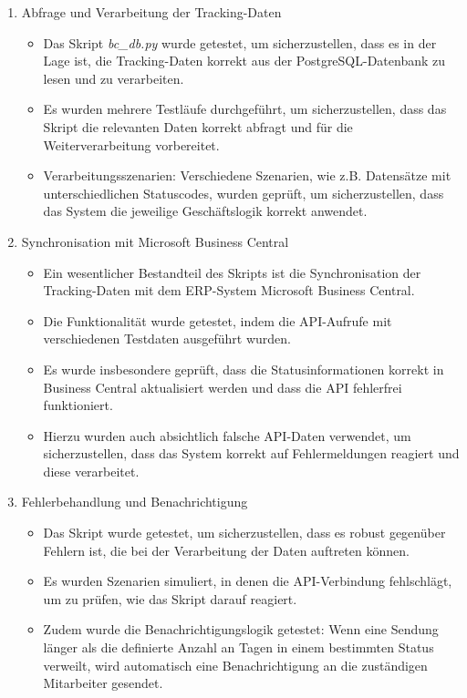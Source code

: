 \begin{enumerate}
    \item Abfrage und Verarbeitung der Tracking-Daten
    \begin{itemize}
        \item Das Skript \textit{bc\_db.py} wurde getestet, um sicherzustellen, dass es in der Lage ist, die Tracking-Daten korrekt aus der PostgreSQL-Datenbank zu lesen und zu verarbeiten.
        \item Es wurden mehrere Testläufe durchgeführt, um sicherzustellen, dass das Skript die relevanten Daten korrekt abfragt und für die Weiterverarbeitung vorbereitet.
        \item Verarbeitungsszenarien: Verschiedene Szenarien, wie z.B. Datensätze mit unterschiedlichen Statuscodes, wurden geprüft, um sicherzustellen, dass das System die jeweilige Geschäftslogik korrekt anwendet.
    \end{itemize}
    \item Synchronisation mit Microsoft Business Central
    \begin{itemize}
        \item Ein wesentlicher Bestandteil des Skripts ist die Synchronisation der Tracking-Daten mit dem ERP-System Microsoft Business Central.
        \item Die Funktionalität wurde getestet, indem die API-Aufrufe mit verschiedenen Testdaten ausgeführt wurden.
        \item Es wurde insbesondere geprüft, dass die Statusinformationen korrekt in Business Central aktualisiert werden und dass die API fehlerfrei funktioniert.
        \item Hierzu wurden auch absichtlich falsche API-Daten verwendet, um sicherzustellen, dass das System korrekt auf Fehlermeldungen reagiert und diese verarbeitet.
    \end{itemize}
    \item Fehlerbehandlung und Benachrichtigung
    \begin{itemize}
        \item Das Skript wurde getestet, um sicherzustellen, dass es robust gegenüber Fehlern ist, die bei der Verarbeitung der Daten auftreten können.
        \item Es wurden Szenarien simuliert, in denen die API-Verbindung fehlschlägt, um zu prüfen, wie das Skript darauf reagiert.
        \item Zudem wurde die Benachrichtigungslogik getestet: Wenn eine Sendung länger als die definierte Anzahl an Tagen in einem bestimmten Status verweilt, wird automatisch eine Benachrichtigung an die zuständigen Mitarbeiter gesendet.

\end{itemize}
\end{enumerate}
